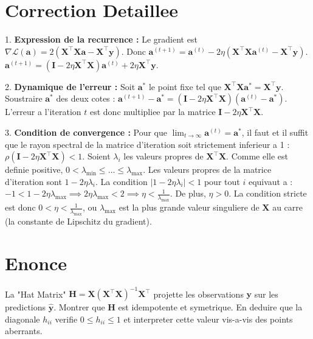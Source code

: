 \documentclass[11pt,a4paper]{report}
\begin{document}
\section{Correction Detaillee}
1. \textbf{Expression de la recurrence :}
   Le gradient est $\nabla \mathcal{L}(\mathbf{a}) = 2(\mathbf{X}^\top\mathbf{X}\mathbf{a} - \mathbf{X}^\top\mathbf{y})$.
   Donc $\mathbf{a}^{(t+1)} = \mathbf{a}^{(t)} - 2\eta (\mathbf{X}^\top\mathbf{X}\mathbf{a}^{(t)} - \mathbf{X}^\top\mathbf{y})$.
   $\mathbf{a}^{(t+1)} = (\mathbf{I} - 2\eta \mathbf{X}^\top\mathbf{X})\mathbf{a}^{(t)} + 2\eta\mathbf{X}^\top\mathbf{y}$.

2. \textbf{Dynamique de l'erreur :}
   Soit $\mathbf{a}^*$ le point fixe tel que $\mathbf{X}^\top\mathbf{X}\mathbf{a}^* = \mathbf{X}^\top\mathbf{y}$.
   Soustraire $\mathbf{a}^*$ des deux cotes :
   $\mathbf{a}^{(t+1)} - \mathbf{a}^* = (\mathbf{I} - 2\eta \mathbf{X}^\top\mathbf{X})(\mathbf{a}^{(t)} - \mathbf{a}^*)$.
   L'erreur a l'iteration $t$ est donc multipliee par la matrice $\mathbf{I} - 2\eta \mathbf{X}^\top\mathbf{X}$.

3. \textbf{Condition de convergence :}
   Pour que $\lim_{t \to \infty} \mathbf{a}^{(t)} = \mathbf{a}^*$, il faut et il suffit que le rayon spectral de la matrice d'iteration soit strictement inferieur a 1 : $\rho(\mathbf{I} - 2\eta \mathbf{X}^\top\mathbf{X}) < 1$.
   Soient $\lambda_i$ les valeurs propres de $\mathbf{X}^\top\mathbf{X}$. Comme elle est definie positive, $0 < \lambda_{\min} \le \dots \le \lambda_{\max}$.
   Les valeurs propres de la matrice d'iteration sont $1 - 2\eta \lambda_i$.
   La condition $|1 - 2\eta \lambda_i| < 1$ pour tout $i$ equivaut a :
   $-1 < 1 - 2\eta \lambda_{\max} \implies 2\eta \lambda_{\max} < 2 \implies \eta < \frac{1}{\lambda_{\max}}$.
   De plus, $\eta > 0$.
   La condition stricte est donc $0 < \eta < \frac{1}{\lambda_{\max}}$, ou $\lambda_{\max}$ est la plus grande valeur singuliere de $\mathbf{X}$ au carre (la constante de Lipschitz du gradient).

\section{Enonce}
La "Hat Matrix" $\mathbf{H} = \mathbf{X}(\mathbf{X}^\top\mathbf{X})^{-1}\mathbf{X}^\top$ projette les observations $\mathbf{y}$ sur les predictions $\hat{\mathbf{y}}$.
Montrer que $\mathbf{H}$ est idempotente et symetrique. En deduire que la diagonale $h_{ii}$ verifie $0 \le h_{ii} \le 1$ et interpreter cette valeur vis-a-vis des points aberrants.
\end{document}
